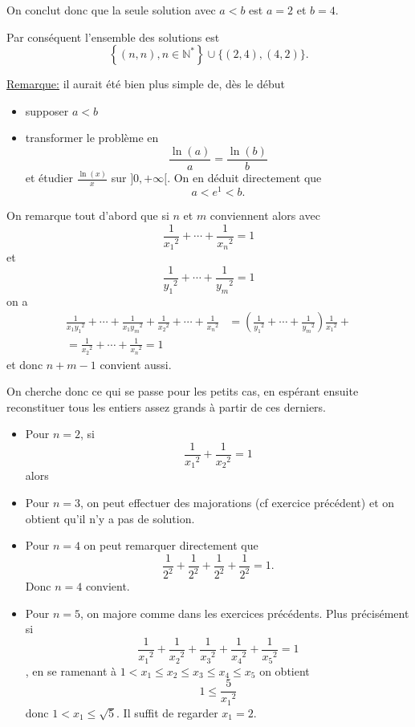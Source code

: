 \begin{sol}
  On conclut donc que la seule solution avec $a<b$  est $a=2$ et $b=4$.


  Par conséquent l'ensemble des solutions est
  \[\boxed{\left\lbrace (n,n), n \in \mathbb{N}^*\right\rbrace \cup \{(2,4),(4,2)\}}.\]

  \underline{Remarque:} il aurait été bien plus simple de, dès le début
  \begin{itemize}
    \item supposer $a < b$
    \item transformer le problème en
          \[\frac{\ln(a)}{a} = \frac{\ln(b)}{b}\]
          et étudier $\frac{\ln(x)}{x}$ sur $]0,+\infty[$. On en déduit directement que
          \[a < e^1 < b.\]
  \end{itemize}
\end{sol}
\begin{sol}
  On remarque tout d'abord que si $n$ et $m$ conviennent alors avec
  \[\frac{1}{{x_1}^2} + \cdots + \frac{1}{{x_n}^2} =1 \]
  et
  \[\frac{1}{{y_1}^2} + \cdots + \frac{1}{{y_m}^2} =1 \]
  on a
  \[\begin{aligned}
      \frac{1}{{x_1 y_1}^2} + \cdots + \frac{1}{{x_1 y_m}^2} + \frac{1}{{x_2}^2} + \cdots + \frac{1}{{x_n}^2} & = \left(\frac{1}{{y_1}^2} + \cdots + \frac{1}{{y_m}^2} \right) \frac{1}{{x_1}^2}+
      \\ = \frac{1}{{x_2}^2} + \cdots + \frac{1}{{x_n}^2} =1
    \end{aligned}\]
  et donc $n+m-1$ convient aussi.


  On cherche donc ce qui se passe pour les petits cas, en espérant ensuite reconstituer tous les entiers assez grands à partir de ces derniers.


  \begin{itemize}
    \item Pour $n=2$, si
          \[\frac{1}{{x_1}^2} + \frac{1}{{x_2}^2} = 1\]
          alors
    \item Pour $n=3$, on peut effectuer des majorations (cf exercice précédent) et on obtient qu'il n'y a pas de solution.
    \item Pour $n=4$ on peut remarquer directement que
          \[\frac{1}{2^2} + \frac{1}{2^2} + \frac{1}{2^2} + \frac{1}{2^2} = 1.\]
          Donc $n=4$ convient.
    \item Pour $n=5$, on majore comme dans les exercices précédents. Plus précisément si
          \[\frac{1}{{x_1}^2} + \frac{1}{{x_2}^2} + \frac{1}{{x_3}^2} + \frac{1}{{x_4}^2} + \frac{1}{{x_5}^2} = 1\]
          , en se ramenant à $1 < x_1 \leq x_2 \leq x_3 \leq x_4 \leq x_5$ on obtient
          \[1 \leq \frac{5}{{x_1}^2}\]
          donc $1 < x_1 \leq \sqrt{5}$. Il suffit de regarder $x_1 = 2$.


\end{itemize}
\end{sol}
